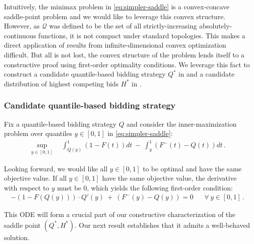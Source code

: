 Intuitively, the minimax problem in \eqref{eq:simpler-saddle} is a convex-concave saddle-point problem and we would like to leverage this convex structure. However, as $\mathcal Q$ was defined to be the set of all strictly-increasing absolutely-continuous functions, it is not compact under standard topologies. This makes a direct application of results from infinite-dimensional convex optimization difficult. 
But all is not lost, the convex structure of the problem lends itself to a constructive proof using first-order optimality conditions. We leverage this fact to construct a candidate quantile-based bidding strategy $Q^*$ in  and a candidate distribution of highest competing bids $H^*$ in . 

\subsubsection{Candidate quantile-based bidding strategy}
\label{sec:construct_Q}

Fix a quantile-based bidding strategy $Q$ and consider the inner-maximization problem over quantiles $y \in [0,1]$ in \eqref{eq:simpler-saddle}:
\begin{align}
\label{eq:inner_max}
	\sup_{y \in [0,1]}\quad \int_{Q(y)}^1 (1 - F(t)) dt\ -\ \int_y^1 (F^-(t) - Q(t)) dt \,.
\end{align}

Looking forward, we would like all $y \in [0,1]$ to be optimal and have the same objective value. If all $y \in [0,1]$ have the same objective value, the derivative with respect to $y$ must be 0, which yields the following first-order condition:
\begin{align}\label{eq:first-ode}
	- (1 - F(Q(y))) \cdot Q'(y) \ +\ (F^-(y) - Q(y)) = 0 &&\forall\ y \in [0,1]\,.
\end{align}

This ODE will form a crucial part of our constructive characterization of the saddle point $(Q^*, H^*)$. 
Our next result establishes that it admits a well-behaved solution.

